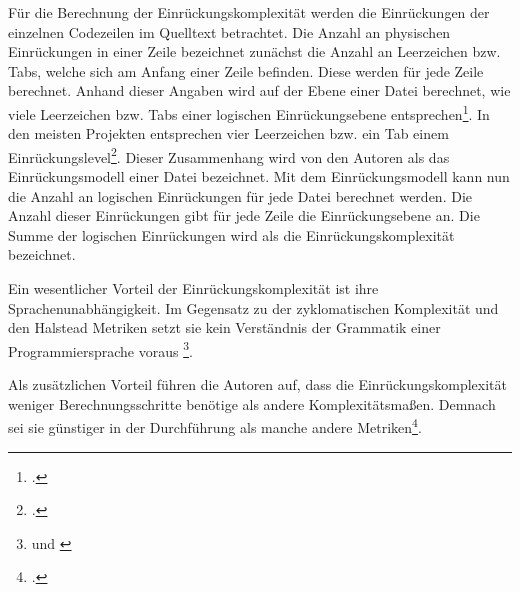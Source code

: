 Für die Berechnung der Einrückungskomplexität werden die Einrückungen
der einzelnen Codezeilen im Quelltext betrachtet. Die Anzahl an
physischen Einrückungen in einer Zeile bezeichnet zunächst die Anzahl an
Leerzeichen bzw. Tabs, welche sich am Anfang einer Zeile befinden. Diese
werden für jede Zeile berechnet. Anhand dieser Angaben wird auf der
Ebene einer Datei berechnet, wie viele Leerzeichen bzw. Tabs einer
logischen Einrückungsebene entsprechen\footcite[Vgl. ][S. 5]{hindleReadingLinesUsing2009}. In den meisten Projekten entsprechen vier Leerzeichen bzw. ein
Tab einem Einrückungslevel\footcite[Vgl. ][S. 9]{hindleReadingLinesUsing2009}.
Dieser Zusammenhang wird von den Autoren als das Einrückungsmodell einer
Datei bezeichnet. Mit dem Einrückungsmodell kann nun die Anzahl an
logischen Einrückungen für jede Datei berechnet werden. Die Anzahl
dieser Einrückungen gibt für jede Zeile die Einrückungsebene an. Die
Summe der logischen Einrückungen wird als die Einrückungskomplexität
bezeichnet.

Ein wesentlicher Vorteil der Einrückungskomplexität ist ihre
Sprachenunabhängigkeit. Im Gegensatz zu der zyklomatischen Komplexität
und den Halstead Metriken setzt sie kein Verständnis der Grammatik einer
Programmiersprache voraus \footnote{\cite[Vgl.][S. 1]{hindleReadingLinesUsing2009} und \cite[S. 2]{hindleReadingLinesUsing2009}}.

Als zusätzlichen Vorteil führen die Autoren auf, dass die
Einrückungskomplexität weniger Berechnungsschritte benötige als andere
Komplexitätsmaßen. Demnach sei sie günstiger in der Durchführung als
manche andere Metriken\footcite[Vgl. ][S. 20f]{hindleReadingLinesUsing2009}.